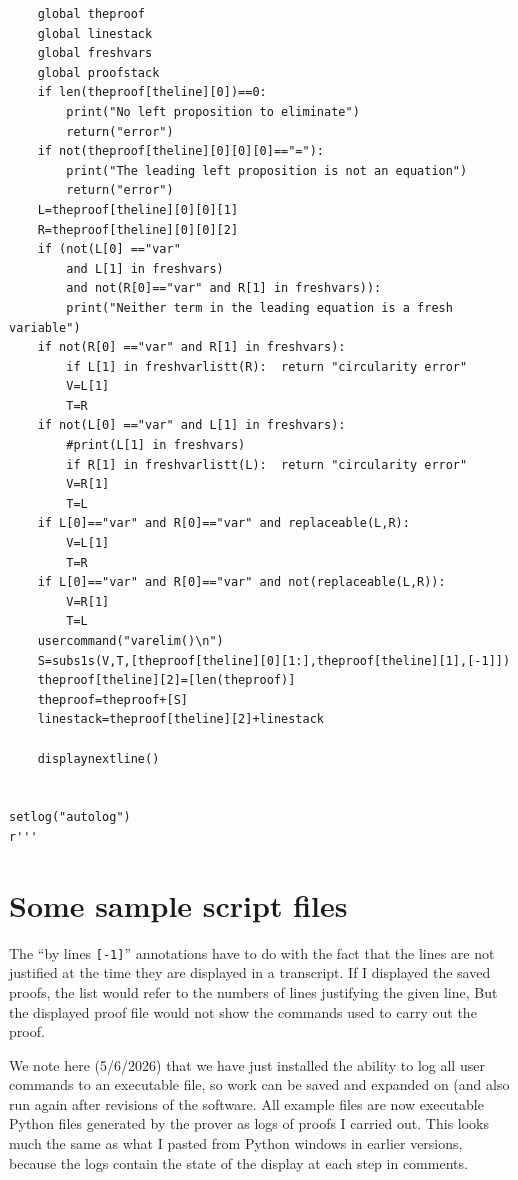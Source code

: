 \documentclass{article}
\begin{document}
\begin{verbatim}
    global theproof
    global linestack
    global freshvars
    global proofstack
    if len(theproof[theline][0])==0:
        print("No left proposition to eliminate")
        return("error")
    if not(theproof[theline][0][0][0]=="="):
        print("The leading left proposition is not an equation")
        return("error")
    L=theproof[theline][0][0][1]
    R=theproof[theline][0][0][2]
    if (not(L[0] =="var" 
        and L[1] in freshvars) 
        and not(R[0]=="var" and R[1] in freshvars)):  
        print("Neither term in the leading equation is a fresh variable")
    if not(R[0] =="var" and R[1] in freshvars):
        if L[1] in freshvarlistt(R):  return "circularity error"
        V=L[1]
        T=R
    if not(L[0] =="var" and L[1] in freshvars):
        #print(L[1] in freshvars)
        if R[1] in freshvarlistt(L):  return "circularity error"
        V=R[1]
        T=L
    if L[0]=="var" and R[0]=="var" and replaceable(L,R):
        V=L[1]
        T=R
    if L[0]=="var" and R[0]=="var" and not(replaceable(L,R)):
        V=R[1]
        T=L
    usercommand("varelim()\n")
    S=subs1s(V,T,[theproof[theline][0][1:],theproof[theline][1],[-1]])
    theproof[theline][2]=[len(theproof)]
    theproof=theproof+[S]
    linestack=theproof[theline][2]+linestack
    
    displaynextline()
    

setlog("autolog")
r'''
\end{verbatim} 

\section{Some sample script files}

The ``by lines {\tt [-1]}''  annotations have to do with the fact that the lines are not justified at the time they are displayed in a transcript.  If I displayed the
saved proofs, the list would refer to the numbers of lines justifying the given line,  But the displayed proof file would not show the commands
used to carry out the proof.

We note here (5/6/2026) that we have just installed the ability to log all user commands to an executable file, so  work can be saved and expanded on
(and also run again after revisions of the software.  All example files are now executable Python files generated by the prover as logs of proofs I carried out.  This looks much the same as what I pasted from Python windows in earlier versions, because the logs contain
the state of the display at each step in comments.
\end{document}
